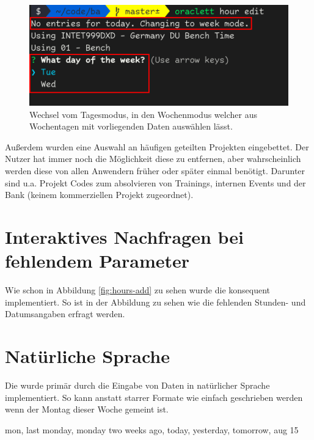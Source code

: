 \documentclass[oneside,bibliography=totocnumbered,BCOR=5mm]{scrbook}
\newenvironment{code}{\captionsetup{type=listing, skip=0pt}}{}
\begin{document}
\begin{figure}
  \centering
  \includegraphics[scale=0.5]{day-week-mode.png}
  \caption{Wechsel vom Tagesmodus, in den Wochenmodus welcher aus Wochentagen mit vorliegenden Daten auswählen lässt.}
  \label{fig:day-week-mode}
\end{figure}

Außerdem wurden eine Auswahl an häufigen geteilten Projekten eingebettet. Der
Nutzer hat immer noch die Möglichkeit diese zu entfernen, aber wahrscheinlich
werden diese von allen Anwendern früher oder später einmal benötigt. Darunter
sind u.a. Projekt Codes zum absolvieren von Trainings, internen Events und der
Bank (keinem kommerziellen Projekt zugeordnet).

\section{Interaktives Nachfragen bei fehlendem Parameter}

Wie schon in Abbildung \ref{fig:hours-add} zu sehen wurde die
 konsequent implementiert. So ist in der
Abbildung zu sehen wie die fehlenden Stunden- und Datumsangaben erfragt werden.


\section{Natürliche Sprache}
\label{sec:sol-natural-lang}

Die  wurde primär durch die Eingabe von Daten in
natürlicher Sprache implementiert. So kann anstatt starrer Formate wie
 einfach  geschrieben werden wenn
der Montag dieser Woche gemeint ist.

\begin{code}
  \medskip
  \begin{shellcode}
  mon, last monday, monday two weeks ago, today, yesterday, tomorrow, aug 15
  \end{shellcode}
\end{code}
\end{document}
